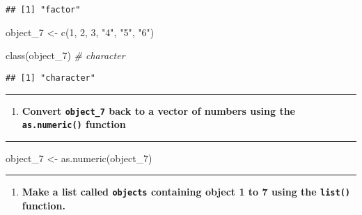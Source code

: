 \documentclass[
]{article}
\newenvironment{Shaded}{\begin{snugshade}}{\end{snugshade}}
\newcommand{\CommentTok}[1]{\textcolor[rgb]{0.56,0.35,0.01}{\textit{#1}}}
\newcommand{\DecValTok}[1]{\textcolor[rgb]{0.00,0.00,0.81}{#1}}
\newcommand{\FunctionTok}[1]{\textcolor[rgb]{0.00,0.00,0.00}{#1}}
\newcommand{\NormalTok}[1]{#1}
\newcommand{\OtherTok}[1]{\textcolor[rgb]{0.56,0.35,0.01}{#1}}
\newcommand{\StringTok}[1]{\textcolor[rgb]{0.31,0.60,0.02}{#1}}
\providecommand{\tightlist}{%
  \setlength{\itemsep}{0pt}\setlength{\parskip}{0pt}}
\begin{document}
\begin{verbatim}
## [1] "factor"
\end{verbatim}

\begin{Shaded}
\begin{Highlighting}[]
\NormalTok{object\_7 }\OtherTok{\textless{}{-}} \FunctionTok{c}\NormalTok{(}\DecValTok{1}\NormalTok{, }\DecValTok{2}\NormalTok{, }\DecValTok{3}\NormalTok{, }\StringTok{"4"}\NormalTok{, }\StringTok{"5"}\NormalTok{, }\StringTok{"6"}\NormalTok{)}

\FunctionTok{class}\NormalTok{(object\_7) }\CommentTok{\# character}
\end{Highlighting}
\end{Shaded}

\begin{verbatim}
## [1] "character"
\end{verbatim}

\begin{center}\rule{0.5\linewidth}{0.5pt}\end{center}

\begin{enumerate}
\def\labelenumi{\arabic{enumi}.}
\setcounter{enumi}{1}
\tightlist
\item
  \textbf{Convert \texttt{object\_7} back to a vector of numbers using
  the \texttt{as.numeric()} function}
\end{enumerate}

\begin{center}\rule{0.5\linewidth}{0.5pt}\end{center}

\begin{Shaded}
\begin{Highlighting}[]
\NormalTok{object\_7 }\OtherTok{\textless{}{-}} \FunctionTok{as.numeric}\NormalTok{(object\_7)}
\end{Highlighting}
\end{Shaded}

\begin{center}\rule{0.5\linewidth}{0.5pt}\end{center}

\begin{enumerate}
\def\labelenumi{\arabic{enumi}.}
\setcounter{enumi}{2}
\tightlist
\item
  \textbf{Make a list called \texttt{objects} containing object 1 to 7
  using the \texttt{list()} function.}
\end{enumerate}
\end{document}
